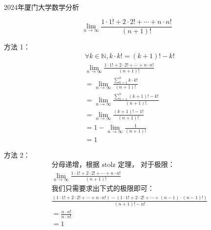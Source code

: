 \documentclass{ctexart}
\begin{document}
\fontsize{30.0pt}{\baselineskip}\selectfont

\begin{center}
    \color{ForestGreen} 2024年厦门大学数学分析
\end{center}

\fontsize{25.0pt}{\baselineskip}\selectfont
\begin{flushleft}
\end{flushleft}
$$\lim_{n\to\infty}\frac{1\cdot{1!} + 2\cdot{2!} + \cdots + n\cdot{n!}}{(n+1)!}$$  

\newpage
{}
\fontsize{20.0pt}{\baselineskip}\selectfont

方法 1：
\begin{align*}
&\forall k \in \mathbb{N}, k\cdot{k!} = (k+1)!-k! \\
&\lim_{n\to\infty}\frac{1\cdot{1!} + 2\cdot{2!} + \cdots + n\cdot{n!}}{(n+1)!} \\
&= \lim_{n\to\infty}\frac{\sum_{k=1}^{n}{k\cdot{k!}}}{(n+1)!} \\
&= \lim_{n\to\infty}\frac{\sum_{k=1}^{n}{(k+1)!-k!}}{(n+1)!} \\
&= \lim_{n\to\infty}\frac{(k+1)!-1!}{(n+1)!} \\
&= 1 - \lim_{n\to\infty}\frac{1}{(n+1)!} \\
&= 1
\end{align*}

\newpage
{}
\fontsize{16.0pt}{\baselineskip}\selectfont

方法 2：
\begin{align*}
&\mbox{分母递增，根据 stolz 定理， 对于极限：}\\
&\lim_{n\to\infty}\frac{1\cdot{1!} + 2\cdot{2!} + \cdots + n\cdot{n!}}{(n+1)!} \\
&\mbox{我们只需要求出下式的极限即可：}\\
&\frac{(1\cdot{1!} + 2\cdot{2!} + \cdots + n\cdot{n!}) - (1\cdot{1!} + 2\cdot{2!} + \cdots + (n-1)\cdot{(n-1)!})}{(n+1)!-n!}\\
&=\frac{n\cdot{n!}}{n\cdot{n!}}\\
&=1
\end{align*}
\end{document}
